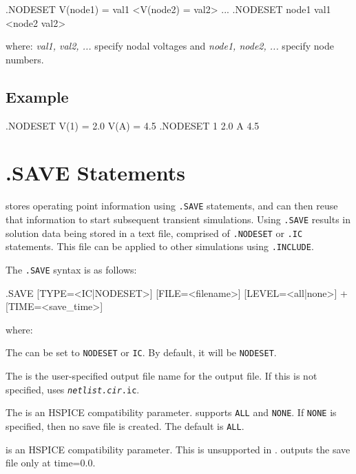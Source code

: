 \begin{vquote}
.NODESET V(node1) = val1 <V(node2) = val2> ...
.NODESET node1 val1 <node2 val2>
\end{vquote}

where:  \emph{val1, val2, ...} specify nodal voltages and \emph{node1, node2, ...} specify node numbers.

\subsection{Example}

\begin{vquote}
.NODESET V(1) = 2.0  V(A) = 4.5
.NODESET  1 2.0 A 4.5
\end{vquote}

\newpage
\section{.SAVE Statements}
\label{SAVE_statement_spec}


\Xyce{} stores operating point information using  \texttt{.SAVE} statements, and can then 
reuse that information to start subsequent transient simulations.  Using \texttt{.SAVE} results in
solution data being stored in a text file, comprised of \texttt{.NODESET} or \texttt{.IC}
statements.  This file can be applied to other simulations using \texttt{.INCLUDE}.

The \texttt{.SAVE} syntax is as follows:

\begin{vquote}
.SAVE [TYPE=<IC|NODESET>] [FILE=<filename>] [LEVEL=<all|none>]
+ [TIME=<save_time>]
\end{vquote}

where:

The  can be set to \texttt{NODESET} or \texttt{IC}.  By
default, it will be \texttt{NODESET}.  

The  is the user-specified output file name for the output file.
If this is not specified, \Xyce{} uses \texttt{\emph{netlist.cir}.ic}.

The  is an HSPICE compatibility parameter.  \Xyce{} supports
\texttt{ALL} and \texttt{NONE}. If \texttt{NONE} is specified, then no save
file is created. The default  is \texttt{ALL}.

 is an HSPICE compatibility parameter. This is unsupported
in \Xyce{}. \Xyce{} outputs the save file only at time=0.0.

